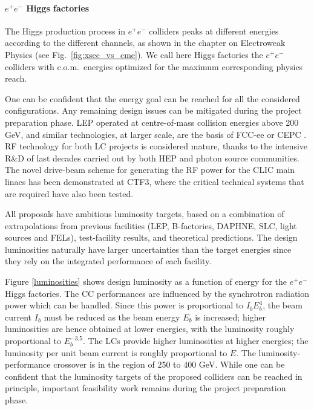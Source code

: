 \paragraph*{$e^+e^-$ Higgs factories}

The Higgs production process in $e^+e^-$ colliders peaks at different energies according to the different channels, as shown in the chapter on Electroweak Physics (see Fig.~\ref{fig:xsec_vs_cme}). We call here Higgs factories the $e^+e^-$ colliders with c.o.m.~energies optimized for the maximum corresponding physics reach.

One can be confident that the energy goal can be reached for all the considered configurations. Any remaining design issues can be mitigated during the project preparation phase. LEP operated at centre-of-mass collision energies above 200 GeV, and similar technologies, at larger scale, are the basis of FCC-ee \cite{fccee}  or CEPC \cite{cepc}. RF technology for both LC projects is considered mature, thanks to the intensive R\&D of last decades carried out by both HEP and photon source communities. The novel drive-beam scheme for generating the RF power for the CLIC main linacs has been demonstrated at CTF3, where the critical technical systems that are required have also been tested.

All proposals have ambitious luminosity targets, based on a combination of extrapolations from previous facilities (LEP, B-factories, DAPHNE, SLC, light sources and FELs), test-facility results, and theoretical predictions. The design luminosities naturally have larger uncertainties than the target energies since they rely on the integrated performance of each facility. 

Figure \ref{luminosities} shows design luminosity as a function of energy for the $e^+e^-$ Higgs factories. The CC performances are influenced by the synchrotron radiation power which can be handled. Since this power is proportional to 
$I_b E_b^4$, the beam current $I_b$ must be reduced as the beam energy $E_b$ is increased; higher luminosities are hence obtained at lower energies, with the luminosity roughly proportional to $E_b^{-3.5}$.  The LCs provide higher luminosities at higher energies; the luminosity per unit beam current is roughly proportional to $E$.  The luminosity-performance crossover is in the region of 250 to 400 GeV. While one can be confident that the luminosity targets of the proposed colliders can be reached in principle, important feasibility work remains during the project preparation phase. 


